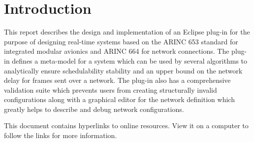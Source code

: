 \section{Introduction}
This report describes the design and implementation of an Eclipse
plug-in for the purpose of designing real-time systems based
on the ARINC 653 standard for integrated modular avionics and
ARINC 664 for network connections. The plug-in defines a 
meta-model for a system which can be used by several algorithms
to analytically ensure schedulability stability and an upper
bound on the network delay for frames sent over a network. 
The plug-in also has a comprehensive validation suite which
prevents users from creating structurally invalid configurations
along with a graphical editor for the network definition which
greatly helps to describe and debug network configurations.

This document contains hyperlinks to online resources. View it
on a computer to follow the links for more information.
